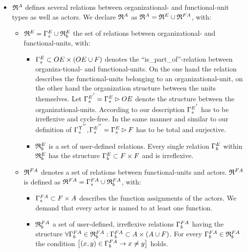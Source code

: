 \begin{itemize}
\begin{itemize}
	\end{itemize}
	\item ${\mathfrak{R}}^{A}$ defines several relations between organizational- and functional-unit types as well as actors. We declare ${\mathfrak{R}}^{A}$ as 		$\relmengeinst = \relmengeinstOE_F \cup \relmengeinstFA$, with:

		\begin{itemize}

		\item $\relmengeinstOE_F = \relstrukturOE_F \cup \relmengebenutzerinstOE_F$ the set of relations between organizational- and functional-units, with:
			\begin{itemize}
			\item $\relstrukturOE_F \subset \oe \times (\oe \cup \f)$ denotes the ``is\_part\_of''-relation between organiza-tional- and functional-units. On the one hand the relation describes the functional-units belonging to an organizational-unit, on the other hand the organization structure between the units themselves. Let ${\relstrukturOE_F}^{'} = \relstrukturOE_F \rhd \oe$ denote the structure between the organizational-units. According to our description ${\relstrukturOE_F}^{'}$ has to be irreflexive and cycle-free. In the same manner and similar to our definition of ${{\Gamma}^{\Upsilon}_{s}}^{''}$,${\relstrukturOE_F}^{''} = \relstrukturOE_F \rhd \f$ has to be total and surjective.

			\item $\relmengebenutzerinstOE_F$ is a set of user-defined relations. Every single relation ${\relbenutzerinstOE_F}$ within $\relmengebenutzerinstOE_F$ has the structure ${\relbenutzerinstOE_F} \subset \f \times \f$ and is irreflexive.
			\end{itemize}

		\item ${\mathfrak{R}}^{FA}$ denotes a set of relations between functional-units and actors. ${\mathfrak{R}}^{FA}$ is defined as ${\mathfrak{R}}^{FA} = {\Gamma}^{FA}_{s} \cup {\mathfrak{R}}^{FA}_{b}$, with:

			\begin{itemize}

			\item ${\Gamma}^{FA}_{s} \subset F \times A$ describes the function assignments of the actors. We demand that every actor is named to at least one function.

			\item ${\mathfrak{R}}^{FA}_{b}$ a set of user-defined, irreflexive relations 	${{\Gamma}^{FA}_{b}}$ having the structure $\forall {{\Gamma}^{FA}_{b}} \in {\mathfrak{R}}^{FA}_{b}: {{\Gamma}^{FA}_{b}} \subset A \times (A \cup F)$. For every ${\Gamma}^{FA}_{b} \in {\mathfrak{R}}^{FA}_{b}$ the condition		$\left[(x,y) \in {\Gamma}^{FA}_{b} \rightarrow x \neq y \right]$ holds.
			\end{itemize}

		\end{itemize}

	\end{itemize}

